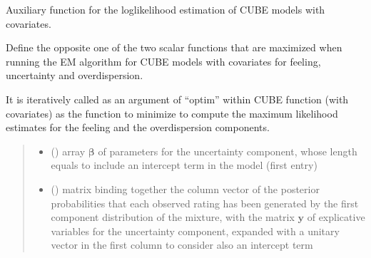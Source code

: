 \documentclass[letterpaper,10pt,english]{sphinxmanual}
\begin{document}

\begin{fulllineitems}
\label{\detokenize{cubmods:cubmods.cube_ywz.Quno}}
\pysigstartsignatures
{}
\pysigstopsignatures
\sphinxAtStartPar
Auxiliary function for the log\sphinxhyphen{}likelihood estimation of CUBE models with covariates.

\sphinxAtStartPar
Define the opposite one of the two scalar functions that are maximized when running the E\sphinxhyphen{}M algorithm
for CUBE models with covariates for feeling, uncertainty and overdispersion.

\sphinxAtStartPar
It is iteratively called as an argument of “optim” within CUBE function (with covariates) as  the function
to minimize to compute the maximum likelihood estimates for the feeling and the overdispersion components.
\begin{quote}\begin{description}
\begin{itemize}
\item {} 
\sphinxAtStartPar
{} () \textendash{} array \(\pmb \beta\) of parameters for the uncertainty component, whose length equals 
 to include an intercept term in the model (first entry)

\item {} 
\sphinxAtStartPar
{} () \textendash{} matrix binding together the column vector of the posterior probabilities
that each observed rating has been generated by the first component distribution of the mixture, with the matrix 
\(\pmb y\) of explicative  variables for the uncertainty component, expanded with a unitary vector in the first column to 
consider also an intercept term

\end{itemize}

\end{description}\end{quote}

\end{fulllineitems}
\end{document}
